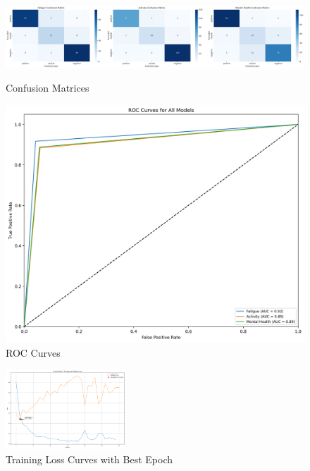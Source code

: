 \begin{figure}[httpb] %
    \centering
    \begin{minipage}{0.45\textwidth}
        \centering
        \includegraphics[width=\textwidth]{../images/sa_confusion_matrices.png} %
        \caption{Confusion Matrices}
        \label{fig:confusion_matrices_sa}
    \end{minipage}
    \hfill
    \begin{minipage}{0.45\textwidth}
        \centering
        \includegraphics[width=\textwidth]{../images/sa_roc_curves.png} %
        \caption{ROC Curves}
        \label{fig:roc_curves_sa}
    \end{minipage}
\end{figure}

\begin{figure}[htpb]
    \centering
    \includegraphics[width=0.4\textwidth]{../images/sa_loss_curves_with_best_epoch.png} %
    \caption{Training Loss Curves with Best Epoch}
    \label{fig:loss_curves_sa}
\end{figure}

